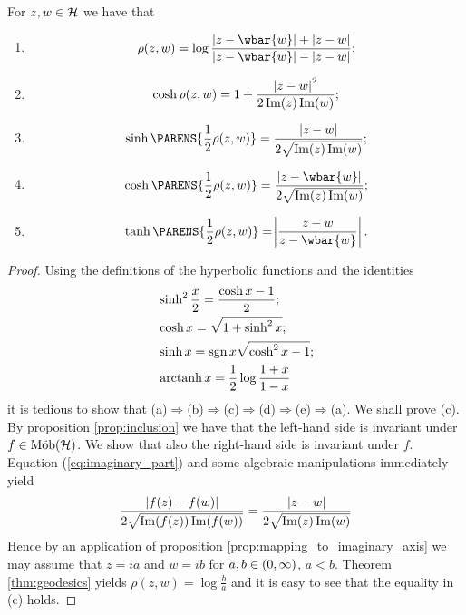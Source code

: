 \begin{theorem}
	For $z,w \in \mathcal{H}$ we have that
	\begin{enumerate}[label = \textup{(}\alph*\textup{)}]
		\item 
			\begin{equation}
				\rho(z,w) = \log \frac{\abs[0]{z - \wbar{w}} + \abs[0]{z - w}}{\abs[0]{z - \wbar{w}} - \abs[0]{z - w}};
			\end{equation}
		\item
			\begin{equation}
				\cosh \rho(z,w) = 1 + \frac{\abs[0]{z - w}^2}{2 \Im(z)\Im(w)};
			\end{equation}
		\item
			\begin{equation}
				\sinh \PARENS{\frac{1}{2}\rho(z,w)} = \frac{\abs[0]{z - w}}{2\sqrt{\Im(z)\Im(w)}};
			\end{equation}
		\item
			\begin{equation}
				\cosh \PARENS{\frac{1}{2}\rho(z,w)} = \frac{\abs[0]{z - \wbar{w}}}{2\sqrt{\Im(z)\Im(w)}};
			\end{equation}
		\item
			\begin{equation}
				\tanh \PARENS{\frac{1}{2}\rho(z,w)} = \abs[3]{\frac{z - w}{z - \wbar{w}}}.
			\end{equation}
	\end{enumerate}
	\label{thm:formulas}
\end{theorem}

\begin{proof}
	Using the definitions of the hyperbolic functions and the identities
	\begin{align*}
		& \sinh^2 \frac{x}{2} = \frac{\cosh x - 1}{2};\\
		& \cosh x = \sqrt{1 + \sinh^2 x};\\
		& \sinh x = \operatorname{sgn} x \sqrt{\cosh^2 x - 1};\\
		& \operatorname{arctanh} x = \frac{1}{2} \log \frac{1 + x}{1 - x}
	\end{align*}
	\noindent it is tedious to show that (a)$\Rightarrow$(b)$\Rightarrow$(c)$\Rightarrow$(d)$\Rightarrow$(e)$\Rightarrow$(a). We shall prove (c). By proposition \ref{prop:inclusion} we have that the left-hand side is invariant under $f \in \mathrm{M\ddot{o}b}(\mathcal{H})$. We show that also the right-hand side is invariant under $f$. Equation (\ref{eq:imaginary_part}) and some algebraic manipulations immediately yield
	\begin{equation*}
		\frac{\abs[0]{f(z) - f(w)}}{2\sqrt{\Im(f(z))\Im(f(w))}} = \frac{\abs[0]{z - w}}{2\sqrt{\Im(z)\Im(w)}}
	\end{equation*}
	Hence by an application of proposition \ref{prop:mapping_to_imaginary_axis} we may assume that $z = ia$ and $w = ib$ for $a,b \in \intoo{0,\infty}$, $a < b$. Theorem \ref{thm:geodesics} yields $\rho(z,w) = \log \frac{b}{a}$ and it is easy to see that the equality in (c) holds.
\end{proof}

